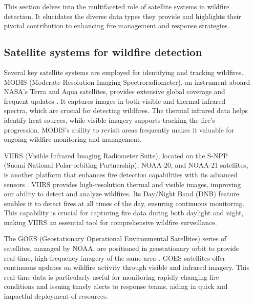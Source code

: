 \documentclass[
  12 pt,
]{Nemilov}
\begin{document}
This section delves into the multifaceted role of satellite systems in wildfire detection. It elucidates the diverse data types they provide and highlights their pivotal contribution to enhancing fire management and response strategies.

\subsection{Satellite systems for wildfire detection}\label{satellite-systems-for-wildfire-detection}

Several key satellite systems are employed for identifying and tracking wildfires. MODIS (Moderate Resolution Imaging Spectroradiometer), an instrument aboard NASA's Terra and Aqua satellites, provides extensive global coverage and frequent updates \citep{davies2008fire}. It captures images in both visible and thermal infrared spectra, which are crucial for detecting wildfires. The thermal infrared data helps identify heat sources, while visible imagery supports tracking the fire's progression. MODIS's ability to revisit areas frequently makes it valuable for ongoing wildfire monitoring and management.

VIIRS (Visible Infrared Imaging Radiometer Suite), located on the S-NPP (Suomi National Polar-orbiting Partnership), NOAA-20, and NOAA-21 satellites, is another platform that enhances fire detection capabilities with its advanced sensors \citep{dalezios2017wildfires}. VIIRS provides high-resolution thermal and visible images, improving our ability to detect and analyze wildfires. Its Day/Night Band (DNB) feature enables it to detect fires at all times of the day, ensuring continuous monitoring. This capability is crucial for capturing fire data during both daylight and night, making VIIRS an essential tool for comprehensive wildfire surveillance.

The GOES (Geostationary Operational Environmental Satellites) series of satellites, managed by NOAA, are positioned in geostationary orbit to provide real-time, high-frequency imagery of the same area \citep{chuvieco2020satellite, prins2001overview}. GOES satellites offer continuous updates on wildfire activity through visible and infrared imagery. This real-time data is particularly useful for monitoring rapidly changing fire conditions and issuing timely alerts to response teams, aiding in quick and impactful deployment of resources.
\end{document}
